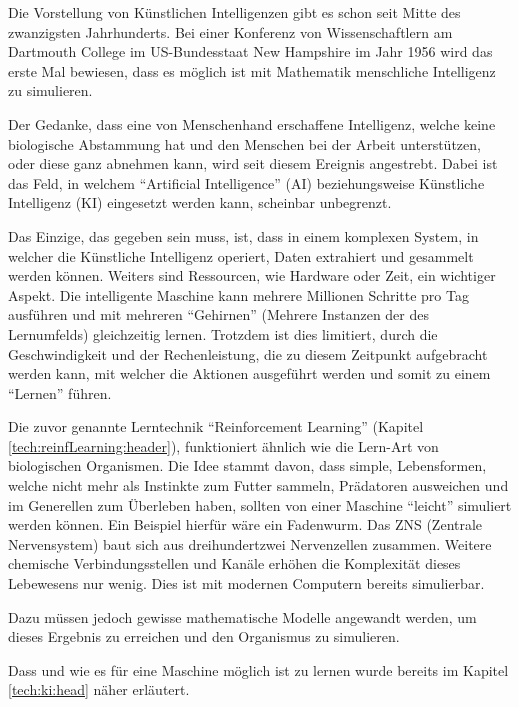 Die Vorstellung von Künstlichen Intelligenzen gibt es schon seit Mitte des zwanzigsten Jahrhunderts. Bei einer Konferenz von Wissenschaftlern am Dartmouth College im US-Bundesstaat New Hampshire im Jahr 1956 wird das erste Mal bewiesen, dass es möglich ist mit Mathematik menschliche Intelligenz zu simulieren.

Der Gedanke, dass eine von Menschenhand erschaffene Intelligenz, welche keine biologische Abstammung hat und den Menschen bei der Arbeit unterstützen, oder diese ganz abnehmen kann, wird seit diesem Ereignis angestrebt. Dabei ist das Feld, in welchem ``Artificial Intelligence'' (AI) beziehungsweise Künstliche Intelligenz (KI) eingesetzt werden kann, scheinbar unbegrenzt.

Das Einzige, das gegeben sein muss, ist, dass in einem komplexen System, in welcher die Künstliche Intelligenz operiert, Daten extrahiert und gesammelt werden können. Weiters sind Ressourcen, wie Hardware oder Zeit, ein wichtiger Aspekt. Die intelligente Maschine kann mehrere Millionen Schritte pro Tag ausführen und mit mehreren ``Gehirnen'' (Mehrere Instanzen der des Lernumfelds) gleichzeitig lernen. Trotzdem ist dies limitiert, durch die Geschwindigkeit und der Rechenleistung, die zu diesem Zeitpunkt aufgebracht werden kann, mit welcher die Aktionen ausgeführt werden und somit zu einem ``Lernen'' führen.

Die zuvor genannte Lerntechnik ``Reinforcement Learning'' (Kapitel \ref{tech:reinfLearning:header}), funktioniert ähnlich wie die Lern-Art von biologischen Organismen. Die Idee stammt davon, dass simple, Lebensformen, welche nicht mehr als Instinkte zum Futter sammeln, Prädatoren ausweichen und im Generellen zum Überleben haben, sollten von einer Maschine ``leicht'' simuliert werden können. Ein Beispiel hierfür wäre ein Fadenwurm. Das ZNS (Zentrale Nervensystem) baut sich aus dreihundertzwei Nervenzellen zusammen. Weitere chemische Verbindungsstellen und Kanäle erhöhen die Komplexität dieses Lebewesens nur wenig. Dies ist mit modernen Computern bereits simulierbar.

Dazu müssen jedoch gewisse mathematische Modelle angewandt werden, um dieses Ergebnis zu erreichen und den Organismus zu simulieren.

Dass und wie es für eine Maschine möglich ist zu lernen wurde bereits im Kapitel \ref{tech:ki:head} näher erläutert.

